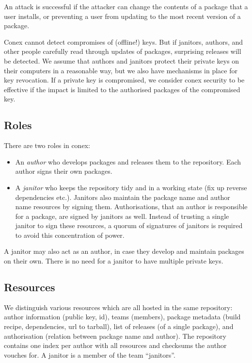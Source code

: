 \documentclass[nocopyrightspace]{sigplanconf}
\begin{document}
An attack is successful if the attacker can change the contents of a package that a user installs, or preventing a user from updating to the most recent version of a package.


Conex cannot detect compromises of (offline!) keys.  But if janitors, authors, and other people carefully read through updates of packages, surprising releases will be detected.
We assume that authors and janitors protect their private keys on their computers in a reasonable way, but we also have mechanisms in place for key revocation.
If a private key is compromised, we consider conex security to be effective if the impact is limited to the authorised packages of the compromised key.

\subsection{Roles}
There are two roles in conex:
\begin{itemize}
  \item An \emph{author} who develops packages and releases them to the repository.  Each author signs their own packages.
  \item A \emph{janitor} who keeps the repository tidy and in a working state (fix up reverse dependencies etc.).  Janitors also maintain the package name and author name resources by signing them.  Authorisations, that an author is responsible for a package, are signed by janitors as well.  Instead of trusting a single janitor to sign these resources, a quorum of signatures of janitors is required to avoid this concentration of power.
\end{itemize}

A janitor may also act as an author, in case they develop and maintain packages on their own.  There is no need for a janitor to have multiple private keys.

\subsection{Resources}
We distinguish various resources which are all hosted in the same repository:
author information (public key, id), teams (members), package metadata (build recipe, dependencies, url to tarball), list of releases (of a single package), and authorisation (relation between package name and author).
The repository contains one index per author with all resources and checksums the author vouches for.
A janitor is a member of the team ``janitors''.
\end{document}
